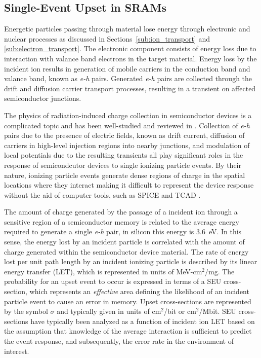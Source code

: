 \subsection{Single-Event Upset in SRAMs} %
\label{sub:single_event_upset_in_srams}
Energetic particles passing through material lose energy through electronic and nuclear processes as discussed in Sections~\ref{sub:ion_transport} and \ref{sub:electron_transport}. 
The electronic component consists of energy loss due to interaction with valance band electrons in the target material. 
Energy loss by the incident ion results in generation of mobile carriers in the conduction band and valance band, known as \emph{e-h} pairs.
Generated \emph{e-h} pairs are collected through the drift and diffusion carrier transport processes, resulting in a transient on affected semiconductor junctions.

The physics of radiation-induced charge collection in semiconductor devices is a complicated topic and has been well-studied and reviewed in \cite{mclean1982charge,oldham1983charge,oldham1986revised,dodd1994three,edmonds1997charge,edmonds1998electric,hubert2000study,edmonds2010theoretical,edmonds2011proposed,edmonds2011theoretical,edmonds2011extension,hooten2012significance}.
Collection of \emph{e-h} pairs due to the presence of electric fields, known as drift current, diffusion of carriers in high-level injection regions into nearby junctions, and modulation of local potentials due to the resulting transients all play significant roles in the response of semicondcutor devices to single ionizing particle events.
By their nature, ionizing particle events generate dense regions of charge in the spatial locations where they interact making it difficult to represent the device response without the aid of computer tools, such as SPICE \cite{gadlage2004single,kauppila2009bias,massengill:1993sc} and TCAD \cite{dodd1994three,dasgupta2007effect,massengill:1993sc}.

The amount of charge generated by the passage of a incident ion through a sensitive region of a semiconductor memory is related to the average energy required to generate a single \emph{e-h} pair, in silicon this energy is 3.6~eV.
In this sense, the energy lost by an incident particle is correlated with the amount of charge generated within the semiconductor device material.
The rate of energy lost per unit path length by an incident ionizing particle is described by its linear energy transfer (LET), which is represented in units of MeV-cm$^2$/mg. 
The probability for an upset event to occur is expressed in terms of a SEU cross-section, which represents an \emph{effective} area defining the likelihood of an incident particle event to cause an error in memory.
Upset cross-sections are represented by the symbol $\sigma$ and typically given in units of cm$^2$/bit or cm$^2$/Mbit.
SEU cross-sections have typically been analyzed as a function of incident ion LET based on the assumption that knowledge of the average interaction is sufficient to predict the event response, and subsequently, the error rate in the environment of interest.

